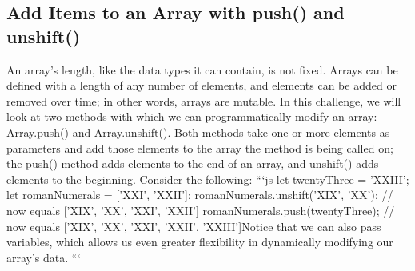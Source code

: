 \documentclass{article}%
\begin{document}
%
\subsection{Add Items to an Array with push() and unshift()}%
\label{subsec:AddItemstoanArraywithpush()andunshift()}%
An array's length, like the data types it can contain, is not fixed. Arrays can be defined with a length of any number of elements, and elements can be added or removed over time; in other words, arrays are mutable. In this challenge, we will look at two methods with which we can programmatically modify an array: Array.push() and Array.unshift().\newline%
Both methods take one or more elements as parameters and add those elements to the array the method is being called on; the push() method adds elements to the end of an array, and unshift() adds elements to the beginning. Consider the following:\newline%
```js\newline%
let twentyThree = 'XXIII';\newline%
let romanNumerals = {[}'XXI', 'XXII'{]};\newline%
romanNumerals.unshift('XIX', 'XX');\newline%
// now equals {[}'XIX', 'XX', 'XXI', 'XXII'{]}\newline%
romanNumerals.push(twentyThree);\newline%
// now equals {[}'XIX', 'XX', 'XXI', 'XXII', 'XXIII'{]}Notice that we can also pass variables, which allows us even greater flexibility in dynamically modifying our array's data.\newline%
```\newline%

%
\end{document}

